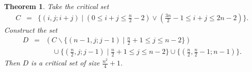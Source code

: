 \documentclass[12pt]{report}
\newtheorem{theorem}{Theorem}
\begin{document}
\begin{theorem}
\label{thm636}
Take the critical set
\begin{eqnarray*}
C & = & \{ (i, j; i+j ) \mid (0 \leq i + j \leq \displaystyle{\frac{n}{2}} - 2) \vee 
(\displaystyle{\frac{3n}{2}} - 1 \leq i + j \leq 2n - 2) \}.
\end{eqnarray*}
Construct the set
\begin{eqnarray*}
D & = & ( C
\backslash 
\{ ( n - 1, j; j - 1 )  \mid \displaystyle{\frac{n}{2}} + 1 \leq j 
\leq n - 2 \} ) \\ 
& & \quad{}\cup \{ ( \displaystyle{\frac{n}{2}}, j; j - 1)  \mid \displaystyle{\frac{n}{2}} + 1 
\leq j \leq n - 2 \} \cup 
\{ (\displaystyle{\frac{n}{2}}, \displaystyle{\frac{n}{2}} - 1; n - 1) \}.
\end{eqnarray*}
Then $D$ is a critical set of size $\displaystyle{\frac{n^{2}}{4}} + 1$.  
\end{theorem}

\end{document}
